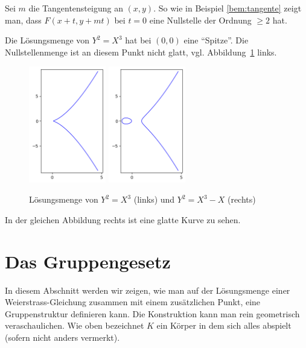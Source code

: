 Sei $m$ die Tangentensteigung an $(x,y)$.
So wie in Beispiel \ref{bem:tangente} zeigt man, dass
$F(x+t,y+mt)$ bei $t=0$ eine Nullstelle der Ordnung $\ge 2$ hat. 

\begin{beispiel}
  Die Lösungsmenge von $Y^2=X^3$ hat bei $(0,0)$ eine ``Spitze''.  Die
  Nullstellenmenge ist an diesem Punkt nicht glatt, vgl.
  Abbildung~\ref{fig:cusp} links.

  \begin{figure}
    \centering    
    \caption{Lösungsmenge von $Y^2=X^3$ (links) und $Y^2 = X^3-X$ (rechts)}
    \label{fig:cusp}
    \includegraphics[width=0.3\textwidth]{./plots/cusp.png}
    \includegraphics[width=0.3\textwidth]{./plots/smooth_n_equal_1.png}
  \end{figure}

  In der gleichen Abbildung rechts ist eine glatte Kurve zu sehen.
\end{beispiel}

\section{Das Gruppengesetz}

In diesem Abschnitt werden wir zeigen, wie man auf der Lösungsmenge
einer Weierstrass-Gleichung zusammen mit einem zusätzlichen Punkt,
eine Gruppenstruktur definieren kann. Die Konstruktion kann man rein
geometrisch veraschaulichen. Wie oben bezeichnet $K$ ein Körper in dem
sich alles abspielt (sofern nicht anders vermerkt). 

